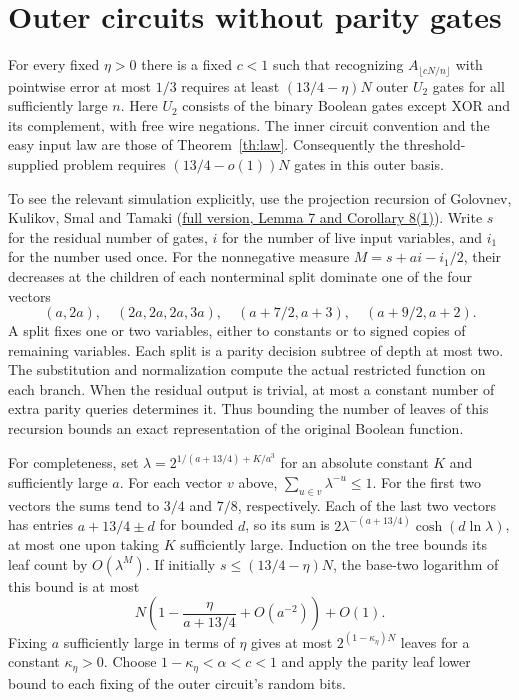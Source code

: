 \section{Outer circuits without parity gates}
For every fixed $\eta>0$ there is a fixed $c<1$ such that recognizing
$A_{\lfloor cN/n\rfloor}$ with pointwise error at most $1/3$ requires
at least $(13/4-\eta)N$ outer $U_2$ gates for all sufficiently large $n$.
Here $U_2$ consists of the binary Boolean gates except XOR and its
complement, with free wire negations. The inner circuit convention and
the easy input law are those of Theorem~\ref{th:law}. Consequently the
threshold-supplied problem requires $(13/4-o(1))N$ gates in this outer basis.

To see the relevant simulation explicitly, use the projection recursion
of Golovnev, Kulikov, Smal and Tamaki (\href{https://golovnev.org/papers/sharp_sat.pdf}
{full version, Lemma 7 and Corollary 8(1)}). Write $s$ for the residual
number of gates, $i$ for the number of live input variables, and $i_1$
for the number used once. For the nonnegative measure
$M=s+a i-i_1/2$, their decreases at the children of each nonterminal
split dominate one of the four vectors
\[
 (a,2a),\quad(2a,2a,2a,3a),\quad
 (a+7/2,a+3),\quad (a+9/2,a+2).
\]
A split fixes one or two variables, either to constants or to signed
copies of remaining variables. Each split is a parity decision subtree
of depth at most two. The substitution and normalization compute the
actual restricted function on each branch. When the residual output is
trivial, at most a constant number of extra parity queries determines
it. Thus bounding the number of leaves of this recursion bounds an
exact representation of the original Boolean function.

For completeness, set $\lambda=2^{1/(a+13/4)+K/a^3}$ for an absolute
constant $K$ and sufficiently large $a$. For each vector $v$ above,
$\sum_{u\in v}\lambda^{-u}\le1$. For the first two vectors the sums
tend to $3/4$ and $7/8$, respectively. Each of the last two vectors
has entries $a+13/4\pm d$ for bounded $d$, so its sum is
$2\lambda^{-(a+13/4)}\cosh(d\ln\lambda)$, at most one upon taking $K$
sufficiently large. Induction on the tree bounds its leaf count by
$O(\lambda^{M})$. If initially $s\le(13/4-\eta)N$, the base-two
logarithm of this bound is at most
\[
 N\left(1-\frac{\eta}{a+13/4}+O(a^{-2})\right)+O(1).
\]
Fixing $a$ sufficiently large in terms of $\eta$ gives at most
$2^{(1-\kappa_\eta)N}$ leaves for a constant $\kappa_\eta>0$.
Choose $1-\kappa_\eta<\alpha<c<1$ and apply the parity leaf lower
bound to each fixing of the outer circuit's random bits.
